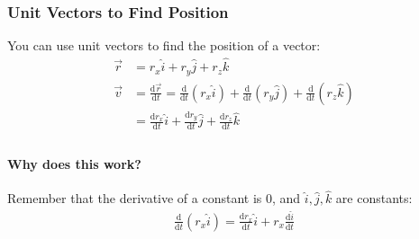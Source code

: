 \documentclass[
  letterpaper,
  DIV=11,
  numbers=noendperiod]{scrartcl}
\let\oldparagraph\paragraph
\renewcommand{\paragraph}[1]{\oldparagraph{#1}\mbox{}}
\begin{document}
\hypertarget{unit-vectors-to-find-position}{%
\subsubsection{Unit Vectors to Find
Position}\label{unit-vectors-to-find-position}}

You can use unit vectors to find the position of a vector:
\begin{align*}
\vec{r} &= r_x\hat{i} + r_y\hat{j} + r_z\hat{k} \\
\vec{v} &= \frac{\mathrm{d}\vec{r}}{\mathrm{d}{t}} = \frac{\mathrm{d}}{\mathrm{d}{t}}(r_x\hat{i}) + \frac{\mathrm{d}}{\mathrm{d}{t}}(r_y\hat{j}) + \frac{\mathrm{d}}{\mathrm{d}{t}}(r_z\hat{k}) \\
&= \frac{\mathrm{d}r_x}{\mathrm{d}t}\hat{i} + \frac{\mathrm{d}r_y}{\mathrm{d}t}\hat{j} + \frac{\mathrm{d}r_z}{\mathrm{d}t}\hat{k} \\
\end{align*}

\hypertarget{why-does-this-work}{%
\paragraph{Why does this work?}\label{why-does-this-work}}

Remember that the derivative of a constant is 0, and
\(\hat{i}, \hat{j}, \hat{k}\) are constants: \begin{align*}
\frac{\mathrm{d}}{\mathrm{d}t}(r_x\hat{i}) = \frac{\mathrm{d}r_x}{\mathrm{d}t}\hat{i} + r_x\frac{\mathrm{d}\hat{i}}{\mathrm{d}t}
\end{align*}
\end{document}
